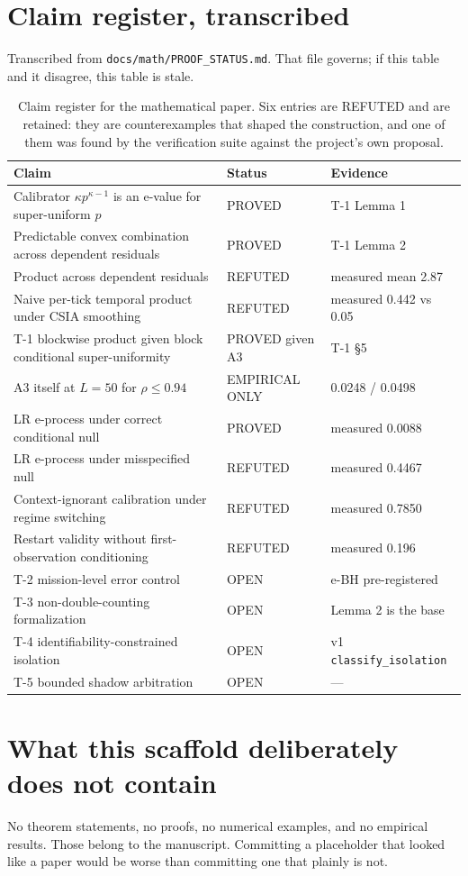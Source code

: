 \documentclass[11pt,a4paper]{article}
\newcommand{\code}[1]{\texttt{\small #1}}
\begin{document}
\section{Claim register, transcribed}

Transcribed from \code{docs/math/PROOF\_STATUS.md}. That file governs; if this
table and it disagree, this table is stale.

\begin{table}[h]
\centering
\small
\begin{tabular}{p{}ll}
\toprule
Claim & Status & Evidence \\
\midrule
Calibrator $\kappa p^{\kappa-1}$ is an e-value for super-uniform $p$
  & PROVED & T-1 Lemma 1 \\
Predictable convex combination across dependent residuals
  & PROVED & T-1 Lemma 2 \\
Product across dependent residuals
  & REFUTED & measured mean 2.87 \\
Naive per-tick temporal product under CSIA smoothing
  & REFUTED & measured 0.442 vs 0.05 \\
T-1 blockwise product given block conditional super-uniformity
  & PROVED given A3 & T-1 \S5 \\
A3 itself at $L=50$ for $\rho \le 0.94$
  & EMPIRICAL ONLY & 0.0248 / 0.0498 \\
LR e-process under correct conditional null
  & PROVED & measured 0.0088 \\
LR e-process under misspecified null
  & REFUTED & measured 0.4467 \\
Context-ignorant calibration under regime switching
  & REFUTED & measured 0.7850 \\
Restart validity without first-observation conditioning
  & REFUTED & measured 0.196 \\
T-2 mission-level error control
  & OPEN & e-BH pre-registered \\
T-3 non-double-counting formalization
  & OPEN & Lemma 2 is the base \\
T-4 identifiability-constrained isolation
  & OPEN & v1 \code{classify\_isolation} \\
T-5 bounded shadow arbitration
  & OPEN & --- \\
\bottomrule
\end{tabular}
\caption{Claim register for the mathematical paper. Six entries are REFUTED
and are retained: they are counterexamples that shaped the construction, and
one of them was found by the verification suite against the project's own
proposal.}
\end{table}

\section{What this scaffold deliberately does not contain}

No theorem statements, no proofs, no numerical examples, and no empirical
results. Those belong to the manuscript. Committing a placeholder that looked
like a paper would be worse than committing one that plainly is not.
\end{document}
